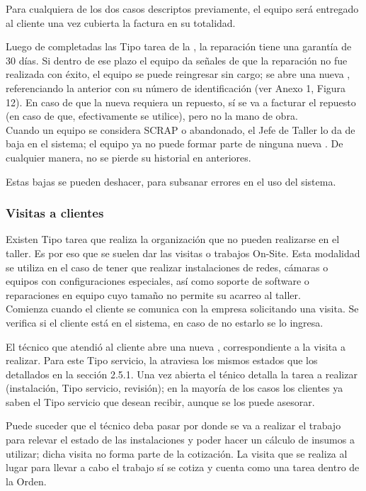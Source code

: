 \documentclass[12pt]{extarticle}
\begin{document}
\begin{spacing}{1.2}
    Para cualquiera de los dos casos descriptos previamente, el equipo será entregado al cliente una vez cubierta la factura en su totalidad.

    Luego de completadas las Tipo tarea de la \OT{}, la reparación tiene una garantía de 30 días. Si dentro de ese plazo el equipo da señales de que la reparación no fue realizada con éxito, el equipo se puede reingresar sin cargo; se abre una nueva \OT{}, referenciando la \OT{} anterior con su número de identificación (ver Anexo 1, Figura 12). En caso de que la nueva \OT{} requiera un repuesto, sí se va a facturar el repuesto (en caso de que, efectivamente se utilice), pero no la mano de obra. \\
    
    Cuando un equipo se considera SCRAP o abandonado, el Jefe de Taller lo da de baja en el sistema; el equipo ya no puede formar parte de ninguna nueva \OT{}. De cualquier manera, no se pierde su historial en \OTs{} anteriores.

    Estas bajas se pueden deshacer, para subsanar errores en el uso del sistema.

    \subsubsection{Visitas a clientes}

    Existen Tipo tarea que realiza la organización que no pueden realizarse en el taller. Es por eso que se suelen dar las visitas o trabajos On-Site. Esta modalidad se utiliza en el caso de tener que realizar instalaciones de redes, cámaras o equipos con configuraciones especiales, así como soporte de software o reparaciones en equipo cuyo tamaño no permite su acarreo al taller.\\

    Comienza cuando el cliente se comunica con la empresa solicitando una visita. Se verifica si el cliente está en el sistema, en caso de no estarlo se lo ingresa.

    El técnico que atendió al cliente abre una nueva \OT{}, correspondiente a la visita a realizar. Para este Tipo servicio, la \OT{} atraviesa los mismos estados que los detallados en la sección 2.5.1.
    Una vez abierta el ténico detalla la tarea a realizar (instalación, Tipo servicio, revisión); en la mayoría de los casos los clientes ya saben el Tipo servicio que desean recibir, aunque se los puede asesorar.

    Puede suceder que el técnico deba pasar por donde se va a realizar el trabajo para relevar el estado de las instalaciones y poder hacer un cálculo de insumos a utilizar; dicha visita no forma parte de la cotización. La visita que se realiza al lugar para llevar a cabo el trabajo sí se cotiza y cuenta como una tarea dentro de la Orden.\\


\end{spacing}
\end{document}
